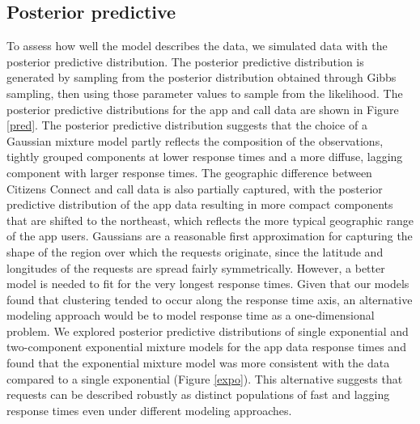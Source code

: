 \documentclass[twoside]{article}
\theoremstyle{theorem}
\theoremstyle{theorem}
\theoremstyle{theorem}
\theoremstyle{lemma}
\theoremstyle{definition}
\theoremstyle{example}
\begin{document}
\subsection{Posterior predictive}
To assess how well the model describes the data, we simulated data with the posterior predictive distribution. The posterior predictive distribution is generated by sampling from the posterior distribution obtained through Gibbs sampling, then using those parameter values to sample from the likelihood. The posterior predictive distributions for the app and call data are shown in Figure \ref{pred}. The posterior predictive distribution suggests that the choice of a Gaussian mixture model partly reflects the composition of the observations, tightly grouped components at lower response times and a more diffuse, lagging component with larger response times. The geographic difference between Citizens Connect and call data is also partially captured, with the posterior predictive distribution of the app data resulting in more compact components that are shifted to the northeast, which reflects the more typical geographic range of the app users. Gaussians are a reasonable first approximation for capturing the shape of the region over which the requests originate, since the latitude and longitudes of the requests are spread fairly symmetrically. However, a better model is needed to fit for the very longest response times. Given that our models found that clustering tended to occur along the response time axis, an alternative modeling approach would be to model response time as a one-dimensional problem. We explored posterior predictive distributions of single exponential and two-component exponential mixture models for the app data response times and found that the exponential mixture model was more consistent with the data compared to a single exponential (Figure \ref{expo}). This alternative suggests that requests can be described robustly as distinct populations of fast and lagging response times even under different modeling approaches. 
\end{document}
